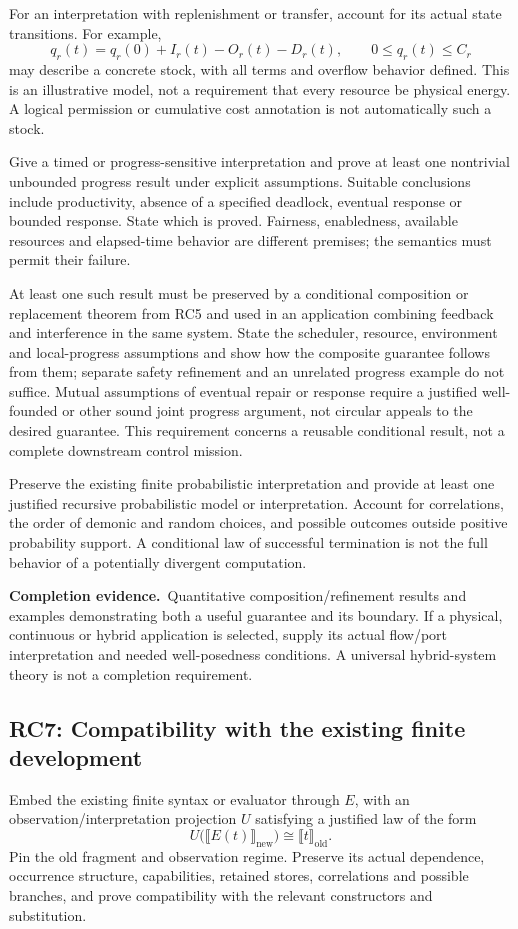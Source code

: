 \documentclass[11pt,a4paper]{article}
\newcommand{\deliver}{\par\textbf{Completion evidence.}\ }
\begin{document}
For an interpretation with replenishment or transfer, account for its actual state transitions. For example,
\[
q_r(t)=q_r(0)+I_r(t)-O_r(t)-D_r(t),\qquad
0\le q_r(t)\le C_r
\]
may describe a concrete stock, with all terms and overflow behavior defined. This is an illustrative model, not a requirement that every resource be physical energy. A logical permission or cumulative cost annotation is not automatically such a stock.

Give a timed or progress-sensitive interpretation and prove at least one nontrivial unbounded progress result under explicit assumptions. Suitable conclusions include productivity, absence of a specified deadlock, eventual response or bounded response. State which is proved. Fairness, enabledness, available resources and elapsed-time behavior are different premises; the semantics must permit their failure.

At least one such result must be preserved by a conditional composition or replacement theorem from RC5 and used in an application combining feedback and interference in the same system. State the scheduler, resource, environment and local-progress assumptions and show how the composite guarantee follows from them; separate safety refinement and an unrelated progress example do not suffice. Mutual assumptions of eventual repair or response require a justified well-founded or other sound joint progress argument, not circular appeals to the desired guarantee. This requirement concerns a reusable conditional result, not a complete downstream control mission.

Preserve the existing finite probabilistic interpretation and provide at least one justified recursive probabilistic model or interpretation. Account for correlations, the order of demonic and random choices, and possible outcomes outside positive probability support. A conditional law of successful termination is not the full behavior of a potentially divergent computation.

\deliver Quantitative composition/refinement results and examples demonstrating both a useful guarantee and its boundary. If a physical, continuous or hybrid application is selected, supply its actual flow/port interpretation and needed well-posedness conditions. A universal hybrid-system theory is not a completion requirement.

\subsection*{RC7: Compatibility with the existing finite development}\label{rc7}
Embed the existing finite syntax or evaluator through \(E\), with an observation/interpretation projection \(U\) satisfying a justified law of the form
\[
U\bigl(\llbracket E(t)\rrbracket_{\mathrm{new}}\bigr)
\cong \llbracket t\rrbracket_{\mathrm{old}}.
\]
Pin the old fragment and observation regime. Preserve its actual dependence, occurrence structure, capabilities, retained stores, correlations and possible branches, and prove compatibility with the relevant constructors and substitution.
\end{document}
